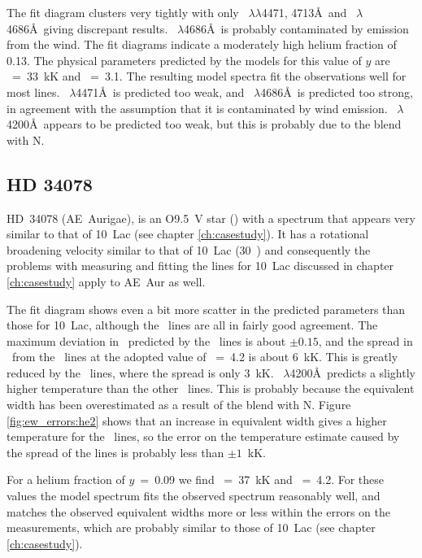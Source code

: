 The fit diagram clusters very tightly with only
\hei~$\lambda\lambda$4471, 4713\AA\ and \heii~$\lambda$4686\AA\ giving
discrepant results. \heii~$\lambda$4686\AA\ is probably contaminated
by emission from the wind. The fit diagrams indicate a moderately high
helium fraction of 0.13. The physical parameters predicted by the
models for this value of $y$ are \teff~=~33~kK and \logg~=~3.1. The
resulting model spectra fit the observations well for most
lines. \hei~$\lambda$4471\AA\ is predicted too weak, and
\heii~$\lambda$4686\AA\ is predicted too strong, in agreement with the
assumption that it is contaminated by wind
emission. \heii~$\lambda$4200\AA\ appears to be predicted too weak,
but this is probably due to the blend with N.

\subsection{HD 34078}  %
\label{analysis:hd034078}

HD~34078 (AE~Aurigae), is an O9.5~V star (\cite{wa:73}) with a
spectrum that appears very similar to that of 10~Lac (see chapter
\ref{ch:casestudy}). It has a rotational broadening velocity similar
to that of 10~Lac (30~\kms) and consequently the problems with
measuring and fitting the lines for 10~Lac discussed in chapter
\ref{ch:casestudy} apply to AE~Aur as well. 

The fit diagram shows even a bit more scatter in the predicted
parameters than those for 10~Lac, although the \hi\ lines are all in
fairly good agreement. The maximum deviation in \logg\ predicted by
the \hi\ lines is about $\pm 0.15$, and the spread in \teff\ from the
\hei\ lines at the adopted value of \logg~=~4.2 is about 6~kK. This is
greatly reduced by the \heii\ lines, where the spread is only
3~kK. \heii~$\lambda$4200\AA\ predicts a slightly higher temperature
than the other \heii\ lines. This is probably because the equivalent
width has been overestimated as a result of the blend with
N. Figure \ref{fig:ew_errors:he2} shows that an increase in
equivalent width gives a higher temperature for the \heii\ lines, so
the error on the temperature estimate caused by the spread of the
lines is probably less than $\pm 1$~kK.

For a helium fraction of $y$~=~0.09 we find \teff~=~37~kK and
\logg~=~4.2. For these values the model spectrum fits the observed
spectrum reasonably well, and matches the observed equivalent widths
more or less within the errors on the measurements, which are probably
similar to those of 10~Lac (see chapter \ref{ch:casestudy}).

